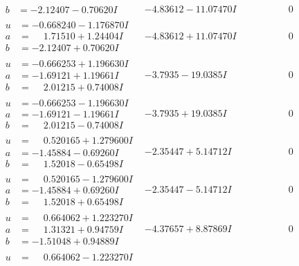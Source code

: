 \documentclass[1p]{elsarticle_modified}
\theoremstyle{definition}
\begin{document}
$$\begin{array}{c|c|c}
\begin{aligned}
b &= -2.12407 - 0.70620 I\end{aligned}
 & -4.83612 - 11.07470 I & \phantom{-0.000000 } 0 \\ \hline\begin{aligned}
u &= -0.668240 - 1.176870 I \\
a &= \phantom{-}1.71510 + 1.24404 I \\
b &= -2.12407 + 0.70620 I\end{aligned}
 & -4.83612 + 11.07470 I & \phantom{-0.000000 } 0 \\ \hline\begin{aligned}
u &= -0.666253 + 1.196630 I \\
a &= -1.69121 + 1.19661 I \\
b &= \phantom{-}2.01215 + 0.74008 I\end{aligned}
 & -3.7935 - 19.0385 I & \phantom{-0.000000 } 0 \\ \hline\begin{aligned}
u &= -0.666253 - 1.196630 I \\
a &= -1.69121 - 1.19661 I \\
b &= \phantom{-}2.01215 - 0.74008 I\end{aligned}
 & -3.7935 + 19.0385 I & \phantom{-0.000000 } 0 \\ \hline\begin{aligned}
u &= \phantom{-}0.520165 + 1.279600 I \\
a &= -1.45884 - 0.69260 I \\
b &= \phantom{-}1.52018 - 0.65498 I\end{aligned}
 & -2.35447 + 5.14712 I & \phantom{-0.000000 } 0 \\ \hline\begin{aligned}
u &= \phantom{-}0.520165 - 1.279600 I \\
a &= -1.45884 + 0.69260 I \\
b &= \phantom{-}1.52018 + 0.65498 I\end{aligned}
 & -2.35447 - 5.14712 I & \phantom{-0.000000 } 0 \\ \hline\begin{aligned}
u &= \phantom{-}0.664062 + 1.223270 I \\
a &= \phantom{-}1.31321 + 0.94759 I \\
b &= -1.51048 + 0.94889 I\end{aligned}
 & -4.37657 + 8.87869 I & \phantom{-0.000000 } 0 \\ \hline\begin{aligned}
u &= \phantom{-}0.664062 - 1.223270 I \\

\end{aligned}
\end{array}$$
\end{document}
